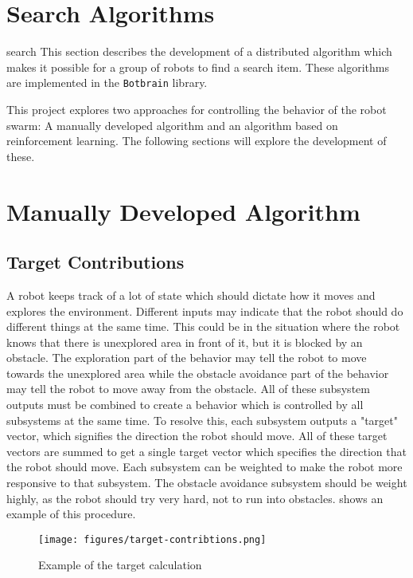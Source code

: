 \section{Search Algorithms}search
This section describes the development of a distributed algorithm which makes it possible for a group of robots to find a search item. These algorithms are implemented in the \texttt{Botbrain} library.

This project explores two approaches for controlling the behavior of the robot swarm: A {\color{red} manually developed} algorithm and an algorithm based on reinforcement learning. The following sections will explore the development of these.

\section{{\color{red}Manually Developed Algorithm}}

\subsection{Target Contributions}
A robot keeps track of a lot of state which should dictate how it moves and explores the environment. Different inputs may indicate that the robot should do different things at the same time. This could be in the situation where the robot knows that there is unexplored area in front of it, but it is blocked by an obstacle. The exploration part of the behavior may tell the robot to move towards the unexplored area while the obstacle avoidance part of the behavior may {\color{red} tell} the robot to move away from the obstacle. All of these subsystem outputs must be combined to create a behavior which is {\color{red} controlled by all subsystems at the same time}. To resolve this, each subsystem outputs a "target" vector, which signifies the direction the robot should move. All of these target vectors are summed to get a single target vector which specifies the direction that the robot should move. Each subsystem can be weighted to make the robot more responsive to that subsystem. The obstacle avoidance subsystem should be weight highly, as the robot should try very hard, not to run into obstacles.  shows an example of this procedure.

\begin{figure}[H]
    \begin{center}
        \texttt{[image: figures/target-contribtions.png]}
    \end{center}
    \caption{Example of the target calculation}
    \label{fig:target-contributions}
\end{figure}



